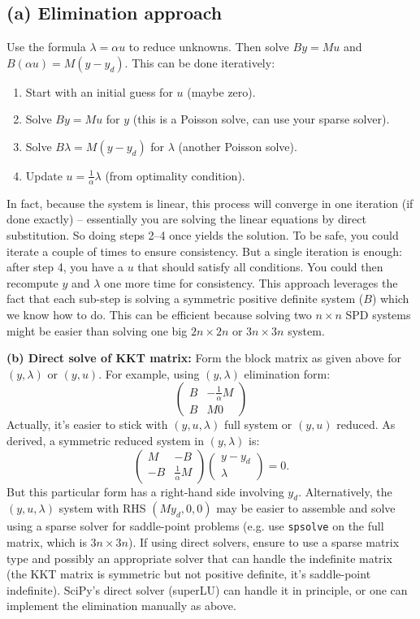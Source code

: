 \documentclass[a4paper,10pt]{report}
\begin{document}
\subsection{(a) Elimination approach}
Use the formula \(\lambda = \alpha u\) to reduce unknowns. Then solve \(B y = M u\) and \(B (\alpha u) = M(y - y_d)\). This can be done iteratively:
\begin{enumerate}
	\item Start with an initial guess for \(u\) (maybe zero).
	\item Solve \(B y = M u\) for \(y\) (this is a Poisson solve, can use your sparse solver).
	\item Solve \(B \lambda = M(y - y_d)\) for \(\lambda\) (another Poisson solve).
	\item Update \(u = \frac{1}{\alpha}\lambda\) (from optimality condition).
\end{enumerate}
In fact, because the system is linear, this process will converge in one iteration (if done exactly) – essentially you are solving the linear equations by direct substitution. So doing steps 2–4 once yields the solution. To be safe, you could iterate a couple of times to ensure consistency. But a single iteration is enough: after step 4, you have a \(u\) that should satisfy all conditions. You could then recompute \(y\) and \(\lambda\) one more time for consistency. This approach leverages the fact that each sub-step is solving a symmetric positive definite system (\(B\)) which we know how to do. This can be efficient because solving two \(n\times n\) SPD systems might be easier than solving one big \(2n \times 2n\) or \(3n \times 3n\) system.

\textbf{(b) Direct solve of KKT matrix:} Form the block matrix as given above for \((y,\lambda)\) or \((y,u)\). For example, using \((y,\lambda)\) elimination form:
\[
	\begin{pmatrix}
		B & -\frac{1}{\alpha} M \\
		B & M 0
	\end{pmatrix}
\]
Actually, it's easier to stick with \((y,u,\lambda)\) full system or \((y,u)\) reduced. As derived, a symmetric reduced system in \((y,\lambda)\) is:
\[
	\begin{pmatrix}
		M  & -B                 \\
		-B & \frac{1}{\alpha} M
	\end{pmatrix}
	\begin{pmatrix} y - y_d \\ \lambda \end{pmatrix}
	= 0.
\]
But this particular form has a right-hand side involving \(y_d\). Alternatively, the \((y,u,\lambda)\) system with RHS \((M y_d, 0, 0)\) may be easier to assemble and solve using a sparse solver for saddle-point problems (e.g. use \texttt{spsolve} on the full matrix, which is \(3n \times 3n\)). If using direct solvers, ensure to use a sparse matrix type and possibly an appropriate solver that can handle the indefinite matrix (the KKT matrix is symmetric but not positive definite, it's saddle-point indefinite). SciPy's direct solver (superLU) can handle it in principle, or one can implement the elimination manually as above.
\end{document}
